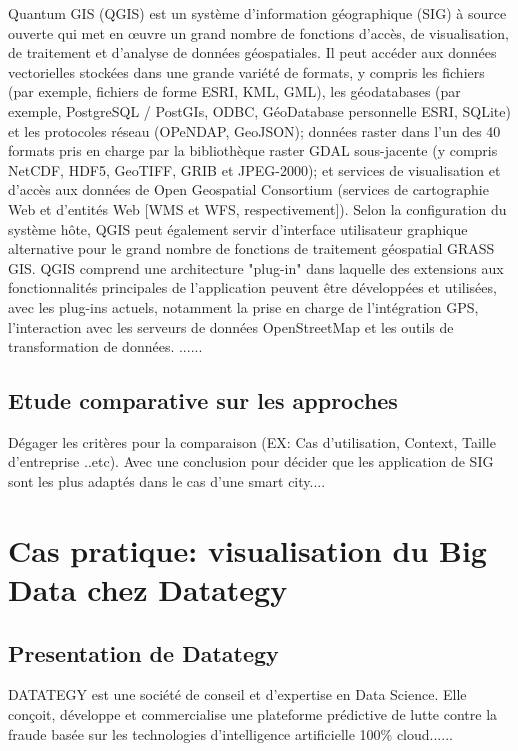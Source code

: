 \documentclass[french, a4paper, 12pt]{report}
\begin{document}
Quantum GIS (QGIS) est un système d’information géographique (SIG) à source ouverte qui met en œuvre un grand nombre de fonctions d’accès, de visualisation, de traitement et d’analyse de données géospatiales. Il peut accéder aux données vectorielles stockées dans une grande variété de formats, y compris les fichiers (par exemple, fichiers de forme ESRI, KML, GML), les géodatabases (par exemple, PostgreSQL / PostGIs, ODBC, GéoDatabase personnelle ESRI, SQLite) et les protocoles réseau (OPeNDAP, GeoJSON); données raster dans l'un des 40 formats pris en charge par la bibliothèque raster GDAL sous-jacente (y compris NetCDF, HDF5, GeoTIFF, GRIB et JPEG-2000); et services de visualisation et d'accès aux données de Open Geospatial Consortium (services de cartographie Web et d'entités Web [WMS et WFS, respectivement]). Selon la configuration du système hôte, QGIS peut également servir d’interface utilisateur graphique alternative pour le grand nombre de fonctions de traitement géospatial GRASS GIS. QGIS comprend une architecture "plug-in" dans laquelle des extensions aux fonctionnalités principales de l'application peuvent être développées et utilisées, avec les plug-ins actuels, notamment la prise en charge de l'intégration GPS, l'interaction avec les serveurs de données OpenStreetMap et les outils de transformation de données.
......

\section{Etude comparative sur les approches }

Dégager les critères pour la comparaison (EX: Cas d’utilisation, Context, Taille d’entreprise ..etc). Avec une conclusion pour décider que les application de SIG sont les plus adaptés dans le cas d’une smart city....














\chapter{Cas pratique: visualisation du Big Data chez Datategy}
\section{Presentation de Datategy}
DATATEGY est une société de conseil et d’expertise en Data Science. Elle conçoit, développe et commercialise une plateforme prédictive de lutte contre la fraude basée sur les technologies d’intelligence artificielle 100\% cloud......
\end{document}
